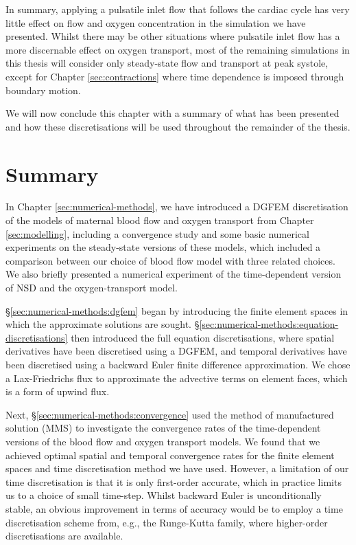         In summary, applying a pulsatile inlet flow that follows the cardiac cycle has very little effect on flow and oxygen concentration in the simulation we have presented. Whilst there may be other situations where pulsatile inlet flow has a more discernable effect on oxygen transport, most of the remaining simulations in this thesis will consider only steady-state flow and transport at peak systole, except for Chapter \ref{sec:contractions} where time dependence is imposed through boundary motion.
        
        We will now conclude this chapter with a summary of what has been presented and how these discretisations will be used throughout the remainder of the thesis.        

    \section{Summary} \label{sec:numerical-methods:summary}
        In Chapter \ref{sec:numerical-methods}, we have introduced a DGFEM discretisation of the models of maternal blood flow and oxygen transport from Chapter \ref{sec:modelling}, including a convergence study and some basic numerical experiments on the steady-state versions of these models, which included a comparison between our choice of blood flow model with three related choices. We also briefly presented a numerical experiment of the time-dependent version of NSD and the oxygen-transport model.

        \S\ref{sec:numerical-methods:dgfem} began by introducing the finite element spaces in which the approximate solutions are sought. \S\ref{sec:numerical-methods:equation-discretisations} then introduced the full equation discretisations, where spatial derivatives have been discretised using a DGFEM, and temporal derivatives have been discretised using a backward Euler finite difference approximation. We chose a Lax-Friedrichs flux to approximate the advective terms on element faces, which is a form of upwind flux.

        Next, \S\ref{sec:numerical-methods:convergence} used the method of manufactured solution (MMS) to investigate the convergence rates of the time-dependent versions of the blood flow and oxygen transport models. We found that we achieved optimal spatial and temporal convergence rates for the finite element spaces and time discretisation method we have used. However, a limitation of our time discretisation is that it is only first-order accurate, which in practice limits us to a choice of small time-step. Whilst backward Euler is unconditionally stable, an obvious improvement in terms of accuracy would be to employ a time discretisation scheme from, e.g., the Runge-Kutta family, where higher-order discretisations are available.

